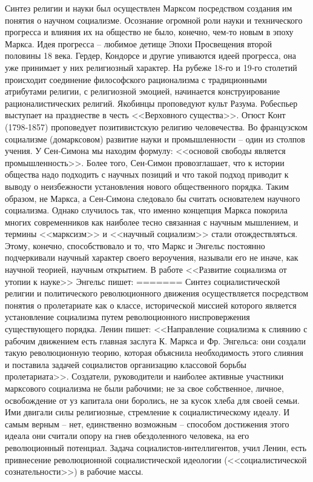 \documentclass{book}
\begin{document}
Синтез религии и науки был осуществлен Марксом посред­ством создания им понятия о научном социализме.  Осознание огромной роли науки и технического прогресса и влияния их на общество не было, конечно, чем‑то новым в эпоху Маркса. Идея прогресса -- любимое детище Эпохи Просвещения второй половины 18 века. Гердер, Кондорсе и другие упиваются идеей прогресса, она уже принимает у них религиозный характер. На рубеже 18‑го и 19‑го столетий происходит соединение философского рационализма с традиционными атрибутами религии, с религиозной эмоцией, начинается конструирование рационалистических религий. Якобинцы проповедуют культ Разума. Робеспьер выступает на празднестве в честь <<Верховного существа>>. Огюст Конт (1798‑1857) проповедует позитивистскую религию человечества. Во французском социализме (домарксовом) развитие науки и промышленности -- один из столпов учения. У Сен‑Симона мы находим формулу: <<основой свободы является промышленность>>. Более того, Сен‑Симон провозглашает, что к истории общества надо подходить с научных позиций и что такой подход приводит к выводу о неизбежности установления нового общественного порядка. Таким образом, не Маркса, а Сен‑Симона следовало бы считать основателем научного социализма. Однако случилось так, что именно концепция Маркса покорила многих современников как наиболее тесно связанная с научным мышлением, и термины <<марксизм>> и <<научный социализм>> стали отождествляться. Этому, конечно, способствовало и то, что Маркс и Энгельс постоянно подчеркивали научный характер своего вероучения, называли его не иначе, как научной теорией, научным открытием. В работе <<Развитие социализма от утопии к науке>> Энгельс пишет:
=======
Синтез социалистической религии и политического революционного движения осуществляется посредством понятия о пролетариате как о классе, исторической миссией которого является установление социализма путем революционного ниспровержения существующего порядка. Ленин пишет: <<Направ­ление социализма к слиянию с рабочим движением есть главная заслуга К. Маркса и Фр. Энгельса: они создали такую револю­ционную теорию, которая объяснила необходимость этого слия­ния и поставила задачей социалистов организацию классовой борьбы пролетариата>>. Создатели, руководители и наиболее активные участники марксового социализма не были рабочими; не за свое собственное, личное, освобождение от уз капитала они боролись, не за кусок хлеба для своей семьи. Ими двигали силы религиозные, стремление к социалистическому иде­алу. И самым верным -- нет, единственно возможным -- способом достижения этого идеала они считали опору на гнев обездоленного человека, на его революционный потенциал. Задача социалистов-интеллигентов, учил Ленин, есть 
привнесение революционной социалистической идеологии (<<социалистической сознательности>>) в рабочие массы.
\end{document}
